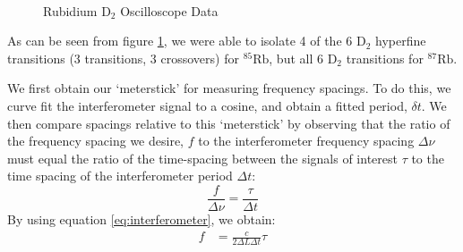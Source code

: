 \documentclass[12pt]{article}
\begin{document}
\begin{figure}%
	\centering
	\,
	\caption{Rubidium D$_2$ Oscilloscope Data}%
	\label{fig:RbOsc}%
\end{figure}

As can be seen from figure \ref{fig:RbOsc}, we were able to isolate 4 of the 6 D$_2$ hyperfine transitions (3 transitions, 3 crossovers) for ${}^{85}\text{Rb}$, but all 6 D$_2$ transitions for ${}^{87}\text{Rb}$.

We first obtain our `meterstick' for measuring frequency spacings.  To do this, we curve fit the interferometer signal to a cosine, and obtain a fitted period, $\delta t$.  We then compare spacings relative to this `meterstick' by observing that the ratio of the frequency spacing we desire, $f$ to the interferometer frequency spacing $\Delta \nu$ must equal the ratio of the time-spacing between the signals of interest $\tau$ to the time spacing of the interferometer period $\Delta t$:
$$ \frac{f}{\Delta \nu}= \frac{\tau}{\Delta t}$$
By using equation \ref{eq:interferometer}, we obtain:
\begin{align}
	f &= \frac{c}{2\Delta L \Delta t}\tau \label{eq:meterstick}
\end{align}
\end{document}
